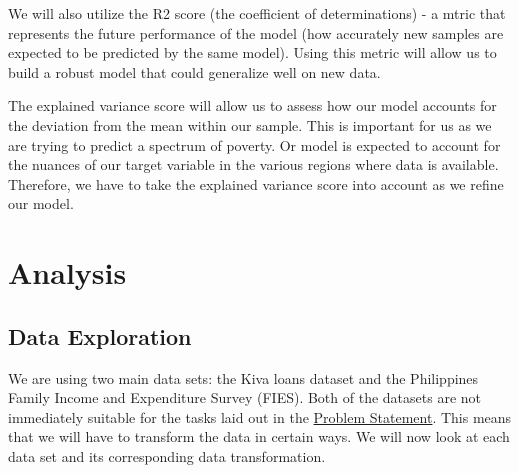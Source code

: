 \documentclass{article}
\begin{document}
We will also utilize the R2 score (the coefficient of determinations) - a mtric that represents the future performance of the model (how accurately new samples are expected to be predicted by the same model). Using this metric will allow us to build a robust model that could generalize well on new data.

The explained variance score will allow us to assess how our model accounts for the deviation from the mean within our sample. This is important for us as we are trying to predict a spectrum of poverty. Or model is expected to account for the nuances of our target variable in the various regions where data is available. Therefore, we have to take the explained variance score into account as we refine our model.

\section{Analysis}
\subsection{Data Exploration}
We are using two main data sets: the Kiva loans dataset and the Philippines Family Income and Expenditure Survey (FIES). Both of the datasets are not immediately suitable for the tasks laid out in the \hyperlink{prob_statement}{Problem Statement}. This means that we will have to transform the data in certain ways. We will now look at each data set and its corresponding data transformation.
\end{document}
